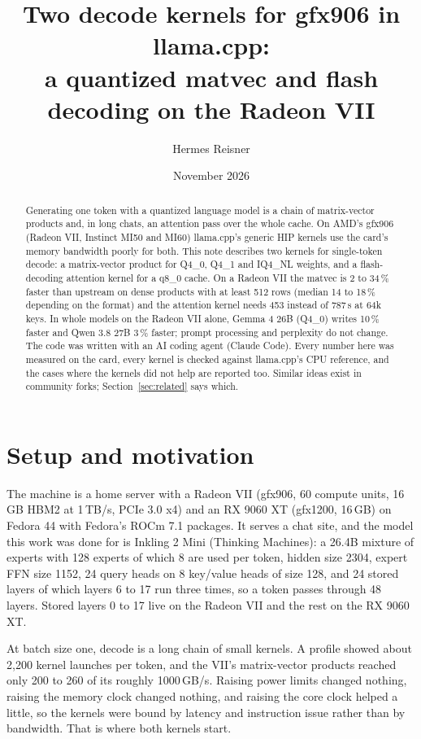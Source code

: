\documentclass[11pt,a4paper]{article}
\title{Two decode kernels for gfx906 in llama.cpp:\\a quantized matvec and flash decoding on the Radeon VII}
\author{Hermes Reisner}
\date{November 2026}
\begin{document}
\maketitle

\begin{abstract}
\noindent
Generating one token with a quantized language model is a chain of matrix-vector products and, in long chats, an
attention pass over the whole cache. On AMD's gfx906 (Radeon VII, Instinct MI50 and MI60) llama.cpp's generic HIP
kernels use the card's memory bandwidth poorly for both. This note describes two kernels for single-token decode: a
matrix-vector product for Q4\_0, Q4\_1 and IQ4\_NL weights, and a flash-decoding attention kernel for a q8\_0 cache. On a Radeon VII the matvec is 2 to 34\,\% faster than upstream on dense products with at least 512 rows
(median 14 to 18\,\% depending on the format) and the attention kernel needs 453 instead of 787\,\textmu s at 64k keys.
In whole models on the Radeon VII alone, Gemma 4 26B (Q4\_0) writes 10\,\% faster and Qwen 3.8 27B 3\,\% faster;
prompt processing and perplexity do not change.
The code was written with an AI coding agent (Claude Code). Every number here was measured on the card, every kernel
is checked against llama.cpp's CPU reference, and the cases where the kernels did not help are reported too. Similar
ideas exist in community forks; Section~\ref{sec:related} says which.
\end{abstract}

\section{Setup and motivation}

The machine is a home server with a Radeon VII (gfx906, 60 compute units, 16\,GB HBM2 at 1\,TB/s, PCIe 3.0 x4) and an
RX 9060 XT (gfx1200, 16\,GB) on Fedora 44 with Fedora's ROCm 7.1 packages. It serves a chat site, and the model this
work was done for is Inkling 2 Mini (Thinking Machines): a 26.4B mixture of experts with 128 experts of which 8 are used
per token, hidden size 2304, expert FFN size 1152, 24 query heads on 8 key/value heads of size 128, and 24 stored layers
of which layers 6 to 17 run three times, so a token passes through 48 layers. Stored layers 0 to 17 live on the Radeon
VII and the rest on the RX 9060 XT.

At batch size one, decode is a long chain of small kernels. A profile showed about 2,200 kernel launches per token, and
the VII's matrix-vector products reached only 200 to 260 of its roughly 1000\,GB/s. Raising power limits changed
nothing, raising the memory clock changed nothing, and raising the core clock helped a little, so the kernels were
bound by latency and instruction issue rather than by bandwidth. That is where both kernels start.
\end{document}
